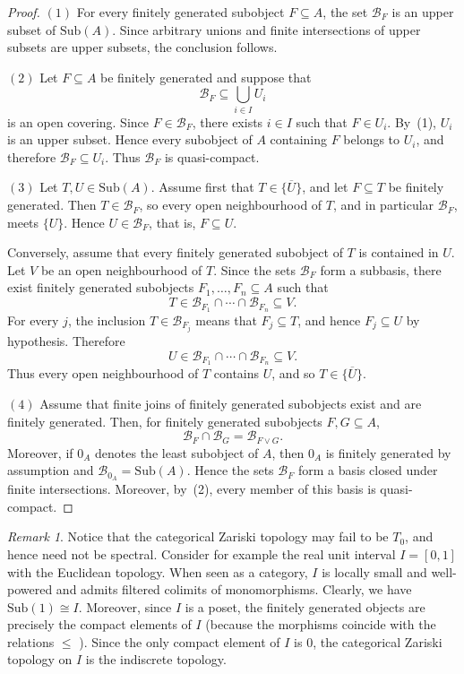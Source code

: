 \documentclass{amsproc}
\theoremstyle{definition}
\theoremstyle{plain}
\theoremstyle{remark}
\newtheorem{remark}[theorem]{Remark}
\numberwithin{equation}{section}
\newcommand{\Cal}[1]{{\mathcal #1}}
\newcommand{\sub}[1]{\mathrm{Sub} (#1)}
\begin{document}
\begin{proof}
$(1)$ For every finitely generated subobject $F\subseteq A$, the set $\Cal B_F$ is an upper subset of $\sub A$. Since arbitrary unions and finite intersections of upper subsets are upper subsets, the conclusion follows.

$(2)$ Let $F\subseteq A$ be finitely generated and suppose that
$$
\Cal B_F\subseteq\bigcup_{i\in I}U_i
$$
is an open covering. Since $F\in\Cal B_F$, there exists $i\in I$ such that $F\in U_i$. By~(1), $U_i$ is an upper subset. Hence every subobject of $A$ containing $F$ belongs to $U_i$, and therefore $\Cal B_F\subseteq U_i$. Thus $\Cal B_F$ is quasi-compact.

$(3)$ Let $T,U\in\sub A$. Assume first that $T\in\overline{\{U\}}$, and let $F\subseteq T$ be finitely generated. Then $T\in\Cal B_F$, so every open neighbourhood of $T$, and in particular $\Cal B_F$, meets $\{U\}$. Hence $U\in\Cal B_F$, that is, $F\subseteq U$.

Conversely, assume that every finitely generated subobject of $T$ is contained in $U$. Let $V$ be an open neighbourhood of $T$. Since the sets $\Cal B_F$ form a subbasis, there exist finitely generated subobjects $F_1,\ldots,F_n\subseteq A$ such that
$$
T\in\Cal B_{F_1}\cap\cdots\cap\Cal B_{F_n}\subseteq V.
$$
For every $j$, the inclusion $T\in\Cal B_{F_j}$ means that $F_j\subseteq T$, and hence $F_j\subseteq U$ by hypothesis. Therefore
$$
U\in\Cal B_{F_1}\cap\cdots\cap\Cal B_{F_n}\subseteq V.
$$
Thus every open neighbourhood of $T$ contains $U$, and so $T\in\overline{\{U\}}$.

$(4)$ Assume that finite joins of finitely generated subobjects exist and are finitely generated. Then, for finitely generated subobjects $F,G\subseteq A$,
$$
\Cal B_F\cap\Cal B_G=\Cal B_{F\vee G}.
$$
Moreover, if $0_A$ denotes the least subobject of $A$, then $0_A$ is finitely generated by assumption and $\Cal B_{0_A}=\sub A$. Hence the sets $\Cal B_F$ form a basis closed under finite intersections. Moreover, by~(2), every member of this basis is quasi-compact.
\end{proof}

\begin{remark}
    Notice that the categorical Zariski topology may fail to be $T_0$, and hence
need not be spectral. Consider for example the real unit interval $I=[0,1]$ with the Euclidean topology. When seen as a category, $I$ is locally small and well-powered and admits filtered colimits of monomorphisms. Clearly, we have $\sub 1\cong I$. Moreover, since $I$ is a poset, the finitely generated objects are precisely the compact elements of $I$ (because the morphisms coincide with the relations $\leq$ ). Since the only compact element of $I$ is $0$, the categorical Zariski topology on $I$ is the indiscrete topology.
\end{remark}
\end{document}
